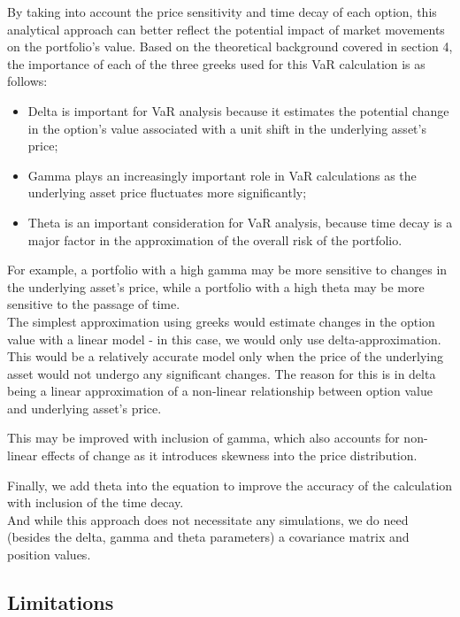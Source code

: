 \documentclass[a4paper, 12pt]{article}
\theoremstyle{definition}
\theoremstyle{plain}
\begin{document}
By taking into account the price sensitivity and time 
decay of each option, this analytical approach can better 
reflect the potential impact of market movements on 
the portfolio's value. Based on the theoretical 
background covered in section 4, the importance of 
each of the three greeks used for this VaR calculation is as follows:

\begin{itemize}
    \item Delta is important for VaR analysis 
    because it estimates the potential change 
    in the option's value associated with a 
    unit shift in the underlying asset's price;
    \item Gamma plays an increasingly important role in 
    VaR calculations as the underlying asset price 
    fluctuates more significantly;
    \item Theta is an important consideration for VaR 
    analysis, because time decay is a major factor
    in the approximation of the overall risk of the portfolio.
\end{itemize}

For example, 
a portfolio with a high gamma may be 
more sensitive to changes in the 
underlying asset's price, 
while a portfolio with a high theta 
may be more sensitive to the passage 
of time.\\


The simplest approximation using greeks would estimate changes 
in the option value with a linear model - in this case, we would 
only use delta-approximation. This would be a relatively accurate 
model only when the price of the underlying asset would not undergo any 
significant changes. The reason for this is in delta being a linear 
approximation of a non-linear relationship between option value and underlying 
asset's price. 

This may be improved with inclusion of gamma, which also accounts for 
non-linear effects of change as it introduces skewness into the price distribution.


Finally, we add theta into the equation to improve the accuracy of the calculation 
with inclusion of the time decay.\\

And while this approach does not necessitate any simulations,
we do need (besides the delta, gamma and theta 
parameters) a covariance matrix and position values. 





\subsection{Limitations}
\end{document}
